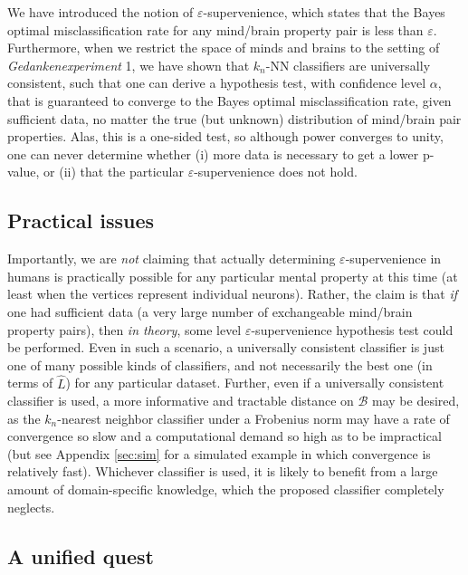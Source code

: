 \documentclass{article}
\newcommand{\mB}{\mathcal{B}}
\newcommand{\eps}{\varepsilon}
\providecommand{\mh}[1]{\widehat{#1}}
\begin{document}
We have introduced the notion of $\eps$-supervenience, which states that the Bayes optimal misclassification rate for any mind/brain property pair is less than $\eps$.  Furthermore, when we restrict the space of minds and brains to the setting of \emph{Gedankenexperiment}  1, we have shown that $k_n$-NN classifiers are universally consistent, such that one can derive a hypothesis test, with confidence level $\alpha$, that is guaranteed to converge to the Bayes optimal misclassification rate, given sufficient data, no matter the true (but unknown) distribution of mind/brain pair properties.  Alas, this is a one-sided test, so although power converges to unity, one can never determine whether (i) more data is necessary to get a lower p-value, or (ii) that the particular $\eps$-supervenience does not hold.  

\subsection{Practical issues} %
\label{par:practical_issues}

Importantly, we are \emph{not} claiming that actually determining $\eps$-supervenience in humans is practically possible for any particular mental property at this time (at least when the vertices represent individual neurons).  Rather, the claim is that \emph{if} one had sufficient data (a very large number of exchangeable mind/brain property pairs), then \emph{in theory}, some level $\eps$-supervenience hypothesis test could be performed.  Even in such a scenario, a universally consistent classifier is just one of many possible kinds of classifiers, and not necessarily the best one (in terms of $\mh{L}$) for any particular dataset.  Further, even if a universally consistent classifier is used, a more informative and tractable distance on $\mB$ may be desired, as the $k_n$-nearest neighbor classifier under a Frobenius norm may have a rate of convergence so slow and a computational demand so high as to be impractical (but see Appendix \ref{sec:sim} for a simulated example in which convergence is relatively fast).  Whichever classifier is used, it is likely to benefit from a large amount of domain-specific knowledge, which the proposed classifier completely neglects. 




\subsection{A unified quest} %
\label{sub:practical_applications}
\end{document}
